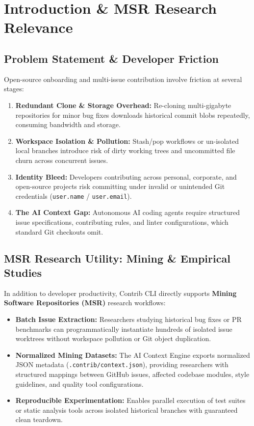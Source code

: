 \documentclass[10pt,conference]{IEEEtran}
\begin{document}
\section{Introduction \& MSR Research Relevance}
\subsection{Problem Statement \& Developer Friction}
Open-source onboarding and multi-issue contribution involve friction at several stages:
\begin{enumerate}
    \item \textbf{Redundant Clone \& Storage Overhead:} Re-cloning multi-gigabyte repositories for minor bug fixes downloads historical commit blobs repeatedly, consuming bandwidth and storage.
    \item \textbf{Workspace Isolation \& Pollution:} Stash/pop workflows or un-isolated local branches introduce risk of dirty working trees and uncommitted file churn across concurrent issues.
    \item \textbf{Identity Bleed:} Developers contributing across personal, corporate, and open-source projects risk committing under invalid or unintended Git credentials (\texttt{user.name} / \texttt{user.email}).
    \item \textbf{The AI Context Gap:} Autonomous AI coding agents require structured issue specifications, contributing rules, and linter configurations, which standard Git checkouts omit.
\end{enumerate}

\subsection{MSR Research Utility: Mining \& Empirical Studies}
In addition to developer productivity, Contrib CLI directly supports \textbf{Mining Software Repositories (MSR)} research workflows:
\begin{itemize}
    \item \textbf{Batch Issue Extraction:} Researchers studying historical bug fixes or PR benchmarks can programmatically instantiate hundreds of isolated issue worktrees without workspace pollution or Git object duplication.
    \item \textbf{Normalized Mining Datasets:} The AI Context Engine exports normalized JSON metadata (\texttt{.contrib/context.json}), providing researchers with structured mappings between GitHub issues, affected codebase modules, style guidelines, and quality tool configurations.
    \item \textbf{Reproducible Experimentation:} Enables parallel execution of test suites or static analysis tools across isolated historical branches with guaranteed clean teardown.
\end{itemize}
\end{document}
